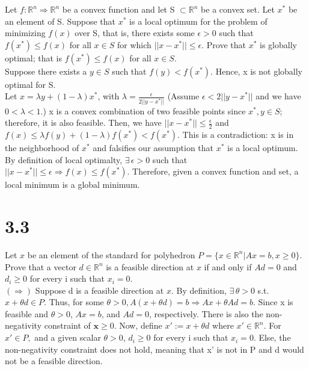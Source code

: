 \documentclass{article}
\begin{document}
Let $f: \mathbb{R}^n \Rightarrow \mathbb{R}^n$ be a convex function and let S $\subset \mathbb{R}^n$ be a convex set.  Let $x^*$ be an element of S.  Suppose that $x^*$ is a local optimum for the problem of minimizing $f(x)$ over S, that is, there exists some $ \epsilon > 0$ such that $f(x^*) \leq f(x)$ for all $x \in S$ for which $||x-x^*|| \leq \epsilon$.  Prove that $x^*$ is globally optimal; that is $f(x^*) \leq f(x)$ for all $x \in S$.\\

\noindent
Suppose there exists a $y \in S$ such that  $f(y) < f(x^*)$.  Hence, x is not globally optimal for S.\\
Let $x = \lambda y + (1-\lambda) x^*$, with $\lambda = \frac{\epsilon}{2 ||y - x^*||}$ (Assume $\epsilon < 2 ||y-x^*||$ and we have $0 < \lambda < 1$.)  x is a convex combination of two feasible points since $x^*, y \in S$; therefore, it is also feasible.  Then, we have $||x - x^*|| \leq \frac{\epsilon}{2}$ and $f(x) \leq \lambda f(y) + (1-\lambda) f(x^*) < f(x^*)$.  This is a contradiction:  x is in the neighborhood of $x^*$ and falsifies our assumption that $x^*$ is a local optimum.  By definition of local optimalty, $ \exists \, \epsilon > 0$ such that $||x-x^*|| \leq \epsilon \Rightarrow f(x) \leq f(x^*).$  Therefore, given a convex function and set, a local minimum is a global minimum.


\section*{3.3}

Let $x$ be an element of the standard for polyhedron $P = \{x \in \mathbb{R}^n | Ax = b, x \geq 0 \}$.  Prove that a vector $d \in \mathbb{R}^n$ is a feasible direction at $x$ if and only if $Ad=0$ and $d_i \geq 0$ for every i such that $x_i = 0$.\\

\noindent
$(\Rightarrow)$
Suppose d is a feasible direction at $x$.  By definition, $\exists \, \theta > 0$ s.t. $x + \theta d \in P$.  Thus, for some $\theta > 0, A(x + \theta d) = b \Rightarrow Ax + \theta Ad = b.$  Since x is feasible and $\theta > 0$, $Ax = b$, and $Ad = 0$, respectively.  There is also the non-negativity constraint of $\mathbf{x} \geq 0$.  Now, define $x' := x + \theta d$ where $x' \in \mathbb{R}^n$.  For $x' \in P,$ and a given scalar $\theta > 0$, $d_i \geq 0$ for every i such that $x_i = 0$.  Else, the non-negativity constraint does not hold, meaning that x' is not in P and d would not be a feasible direction.\\
\end{document}
